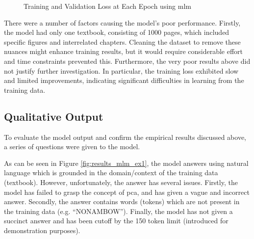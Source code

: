 \begin{figure}[ht!]
\centering
\caption{Training and Validation Loss at Each Epoch using \acrshort{mlm}}
\label{fig:results_mlm_loss}
\end{figure}

There were a number of factors causing the model's poor performance. Firstly, the model had only one textbook, consisting of 1000 pages, which included specific figures and interrelated chapters. Cleaning the dataset to remove these nuances might enhance training results, but it would require considerable effort and time constraints prevented this. Furthermore, the very poor results above did not justify further investigation. In particular, the training loss exhibited slow and limited improvements, indicating significant difficulties in learning from the training data.

\subsection{Qualitative Output}
To evaluate the model output and confirm the empirical results discussed above, a series of questions were given to the model.

As can be seen in Figure \ref{fig:results_mlm_ex1}, the model answers using natural language which is grounded in the domain/context of the training data (textbook). However, unfortunately, the answer has several issues. Firstly, the model has failed to grasp the concept of \acrfull{pca}, and has given a vague and incorrect answer. Secondly, the answer contains words (tokens) which are not present in the training data (e.g. ``NONAMBOW''). Finally, the model has not given a succinct answer and has been cutoff by the 150 token limit (introduced for demonstration purposes). 

